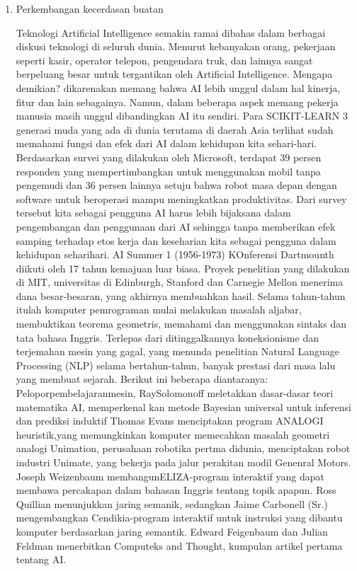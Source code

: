 \begin{enumerate}
\item Perkembangan kecerdasan buatan
	\par Teknologi Artiﬁcial Intelligence semakin ramai dibahas dalam berbagai diskusi teknologi di seluruh dunia. Menurut kebanyakan orang, pekerjaan seperti kasir, operator telepon, pengendara truk, dan lainnya sangat berpeluang besar untuk tergantikan oleh Artiﬁcial Intelligence. Mengapa demikian? dikarenakan memang bahwa AI lebih unggul dalam hal kinerja, ﬁtur dan lain sebagainya. Namun, dalam beberapa aspek memang pekerja manusia masih unggul dibandingkan AI itu sendiri. Para SCIKIT-LEARN 3 generasi muda yang ada di dunia terutama di daerah Asia terlihat sudah memahami fungsi dan efek dari AI dalam kehidupan kita sehari-hari. Berdasarkan survei yang dilakukan oleh Microsoft, terdapat 39 persen responden yang mempertimbangkan untuk menggunakan mobil tanpa pengemudi dan 36 persen lainnya setuju bahwa robot masa depan dengan software untuk beroperasi mampu meningkatkan produktivitas. Dari survey tersebut kita sebagai pengguna AI harus lebih bijaksana dalam pengembangan dan penggunaan dari AI sehingga tanpa memberikan efek samping terhadap etos kerja dan keseharian kita sebagai pengguna dalam kehidupan seharihari. AI Summer 1 (1956-1973) KOnferensi Dartmounth diikuti oleh 17 tahun kemajuan luar biasa. Proyek penelitian yang dilakukan di MIT, universitas di Edinburgh, Stanford dan Carnegie Mellon menerima dana besar-besaran, yang akhirnya membuahkan hasil. Selama tahun-tahun itulah komputer pemrograman mulai melakukan masalah aljabar, membuktikan teorema geometris, memahami dan menggunakan sintaks dan tata bahasa Inggris. Terlepas dari ditinggalkannya koneksionisme dan terjemahan mesin yang gagal, yang menunda penelitian Natural Language Processing (NLP) selama bertahun-tahun, banyak prestasi dari masa lalu yang membuat sejarah. Berikut ini beberapa diantaranya: Peloporpembelajaranmesin, RaySolomonoff meletakkan dasar-dasar teori matematika AI, memperkenal kan metode Bayesian universal untuk inferensi dan prediksi induktif Thomas Evans menciptakan program ANALOGI heuristik,yang memungkinkan komputer memecahkan masalah geometri analogi Unimation, perusahaan robotika pertma didunia, menciptakan robot industri Unimate, yang bekerja pada jalur perakitan modil Genenral Motors. Joseph Weizenbaum membangunELIZA-program interaktif yang dapat membawa percakapan dalam bahasan Inggris tentang topik apapun. Ross Quillian menunjukkan jaring semanik, sedangkan Jaime Carbonell (Sr.) mengembangkan Cendikia-program interaktif untuk instruksi yang dibantu komputer berdasarkan jaring semantik. Edward Feigenbaum dan Julian Feldman menerbitkan Computeks and Thought, kumpulan artikel pertama tentang AI.
	

\end{enumerate}
